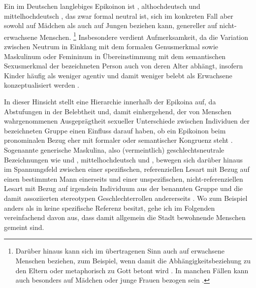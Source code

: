 Ein im Deutschen langlebiges Epikoinon ist ,
althochdeutsch  und
mittelhochdeutsch , das zwar formal neutral
ist, sich im konkreten Fall aber sowohl auf Mädchen als auch auf Jungen
beziehen kann, genereller auf nicht-erwachsene Menschen.%
%
	\footnote{Darüber hinaus kann sich  im übertragenen Sinn auch auf
		erwachsene Menschen beziehen, zum Beispiel, wenn damit die
		Abhängigkeitsbeziehung zu den Eltern oder metaphorisch zu Gott betont
		wird \autocite[s.\,v.~\textit{kint}]{lexer:mhdhwb}. In manchen Fällen
		kann  auch besonders auf Mädchen oder junge Frauen bezogen
		sein \autocites[808--816]{drw7}[s.\,v.~\textit{Kind}]{duden-online}.}
%
Insbesondere  verdient Aufmerksamkeit, da die Variation zwischen
Neutrum in Einklang mit dem formalen Genusmerkmal sowie Maskulinum oder
Femininum in Übereinstimmung mit dem semantischen Sexusmerkmal der bezeichneten
Person auch von deren Alter abhängt, insofern Kinder häufig als weniger agentiv
und damit weniger belebt als Erwachsene konzeptualisiert werden
\autocites[196]{comrie1989}[258--259]{birkenesfleischer2022}[151]{klein2022}.

In dieser Hinsicht stellt \citet[172--174]{klein2022} eine Hierarchie innerhalb
der Epikoina auf, da Abstufungen in der Belebtheit und, damit einhergehend, der
von Menschen wahrgenommenen Ausgeprägtheit sexueller Unterschiede zwischen
Individuen der bezeichneten Gruppe einen Einfluss darauf haben, ob ein
Epikoinon beim pronominalen Bezug eher mit formaler oder semantischer Kongruenz
steht \autocite[vgl.~auch][74--83]{kotthoffnuebling2018}. Sogenannte generische
Maskulina, also (vermeintlich) geschlechtsneutrale Bezeichnungen wie
 und , mittelhochdeutsch
 und , bewegen sich darüber hinaus im Spannungsfeld
zwischen einer spezifischen, referenziellen Lesart mit Bezug auf einen
bestimmten Mann einerseits und einer unspezifischen, nicht-referenziellen
Lesart mit Bezug auf irgendein Individuum aus der benannten Gruppe und die
damit assoziierten stereotypen Geschlechterrollen andererseits
\autocites[91--122]{kotthoffnuebling2018}[159--160, 179--180]{klein2022}. Wo
zum Beispiel  anders als in  keine
spezifische Referenz besitzt, gehe ich im Folgenden vereinfachend davon aus,
dass damit allgemein die Stadt bewohnende Menschen gemeint sind.


